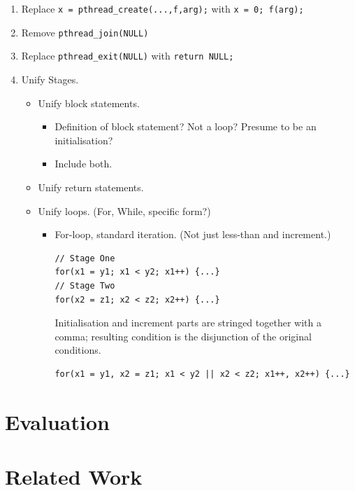 \begin{enumerate}
\item Replace \lstinline|x = pthread_create(...,f,arg);| with \lstinline|x = 0; f(arg);|
\item Remove \lstinline|pthread_join(NULL)|
\item Replace \lstinline|pthread_exit(NULL)| with \lstinline|return NULL;|
\item Unify Stages.
  \begin{itemize}
  \item Unify block statements.
    \begin{itemize}
    \item Definition of block statement? Not a loop? Presume to be an initialisation?
    \item Include both. 
    \end{itemize}
  \item Unify return statements.
  \item Unify loops. (For, While, specific form?)
    \begin{itemize}
    \item For-loop, standard iteration. (Not just less-than and increment.)
    \begin{lstlisting}[frame=single]
// Stage One
for(x1 = y1; x1 < y2; x1++) {...}
// Stage Two
for(x2 = z1; x2 < z2; x2++) {...}
    \end{lstlisting}
    Initialisation and increment parts are stringed together with a comma; resulting condition is the disjunction of the original conditions.
    \begin{lstlisting}[frame=single]
for(x1 = y1, x2 = z1; x1 < y2 || x2 < z2; x1++, x2++) {...}
    \end{lstlisting}
    \end{itemize}
  \end{itemize}
\end{enumerate}


\section{Evaluation}

\section{Related Work}

